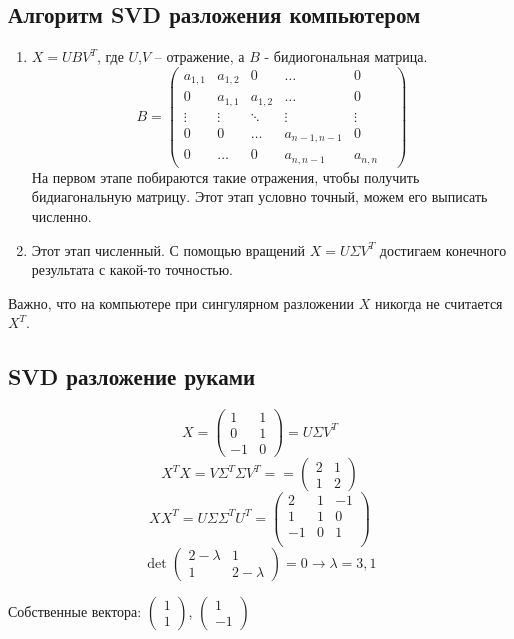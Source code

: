 \documentclass[12pt]{article} %
\theoremstyle{definition} %
\begin{document}
\subsection{Алгоритм SVD разложения компьютером}
\begin{enumerate}
\item $X=UBV^T$, где $U$,$V$ -- отражение, а $B$ - бидиогональная матрица.
\[B = \begin{pmatrix}
a_{1,1} & a_{1,2} & 0 & \hdots & 0 \\
0 & a_{1,1} & a_{1,2} & \hdots & 0 \\
\vdots & \vdots & \ddots & \vdots & \vdots \\
0 & 0 & \hdots & a_{n-1,n-1} & 0 \\
0 & \hdots & 0 & a_{n,n-1} & a_{n,n} & 
\end{pmatrix}
\]
На первом этапе побираются такие отражения, чтобы получить бидиагональную матрицу. Этот этап условно точный, можем его выписать численно.
\item Этот этап численный. С помощью вращений  $X = U \Sigma V^T$ достигаем конечного результата с какой-то точностью.
\end{enumerate}
Важно, что на компьютере при сингулярном разложении $X$ никогда не считается $X^T$.
\subsection{SVD разложение руками}
\[
X = \begin{pmatrix}
1 & 1  \\
0 & 1 \\
-1 & 0 
\end{pmatrix} = U \Sigma V^T
\]
\[X^TX = V \Sigma^T \Sigma V^T= = \begin{pmatrix}
2 & 1 \\
1 & 2
\end{pmatrix}\]
\[XX^T= U \Sigma \Sigma^T U^T= \begin{pmatrix}
2 & 1 & -1 \\
1& 1 & 0 \\
-1 & 0 & 1 \\
\end{pmatrix}\]
\[
\det \begin{pmatrix}
2-\lambda & 1 \\
1 & 2-\lambda
\end{pmatrix}=0 \rightarrow \lambda = 3,1
\]

Собственные вектора: $\begin{pmatrix}
1 \\
1
\end{pmatrix}$, $\begin{pmatrix}
1 \\
-1
\end{pmatrix}$
\end{document}
